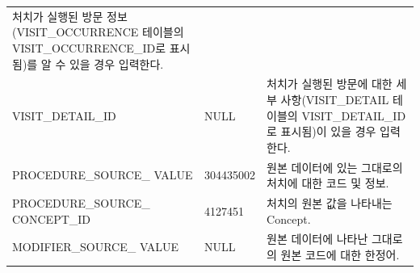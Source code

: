\documentclass[11pt]{book}
\theoremstyle{definition}
\theoremstyle{definition}
\theoremstyle{definition}
\theoremstyle{remark}
\begin{document}
\begin{longtable}[]{@{}lll@{}}
\begin{minipage}[t]{0.48\columnwidth}
처치가 실행된 방문 정보(VISIT\_OCCURRENCE 테이블의
VISIT\_OCCURRENCE\_ID로 표시됨)를 알 수 있을 경우 입력한다.\strut
\end{minipage}\tabularnewline
\begin{minipage}[t]{0.28\columnwidth}\raggedright\strut
VISIT\_DETAIL\_ID\strut
\end{minipage} & \begin{minipage}[t]{0.16\columnwidth}\raggedright\strut
NULL\strut
\end{minipage} & \begin{minipage}[t]{0.48\columnwidth}\raggedright\strut
처치가 실행된 방문에 대한 세부 사항(VISIT\_DETAIL 테이블의
VISIT\_DETAIL\_ID로 표시됨)이 있을 경우 입력한다.\strut
\end{minipage}\tabularnewline
\begin{minipage}[t]{0.28\columnwidth}\raggedright\strut
PROCEDURE\_SOURCE\_ VALUE\strut
\end{minipage} & \begin{minipage}[t]{0.16\columnwidth}\raggedright\strut
304435002\strut
\end{minipage} & \begin{minipage}[t]{0.48\columnwidth}\raggedright\strut
원본 데이터에 있는 그대로의 처치에 대한 코드 및 정보.\strut
\end{minipage}\tabularnewline
\begin{minipage}[t]{0.28\columnwidth}\raggedright\strut
PROCEDURE\_SOURCE\_ CONCEPT\_ID\strut
\end{minipage} & \begin{minipage}[t]{0.16\columnwidth}\raggedright\strut
4127451\strut
\end{minipage} & \begin{minipage}[t]{0.48\columnwidth}\raggedright\strut
처치의 원본 값을 나타내는 Concept.\strut
\end{minipage}\tabularnewline
\begin{minipage}[t]{0.28\columnwidth}\raggedright\strut
MODIFIER\_SOURCE\_ VALUE\strut
\end{minipage} & \begin{minipage}[t]{0.16\columnwidth}\raggedright\strut
NULL\strut
\end{minipage} & \begin{minipage}[t]{0.48\columnwidth}\raggedright\strut
원본 데이터에 나타난 그대로의 원본 코드에 대한 한정어.\strut
\end{minipage}\tabularnewline
\bottomrule
\end{longtable}
\end{document}
